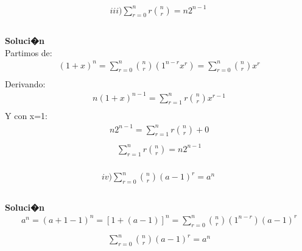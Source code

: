 \documentclass{article}
\begin{document}
\begin{enumerate}
    
     \begin{gather*}
         iii) \sum_{r=0}^{n} r \binom{n}{r} = n2^{n-1}\\ 
    \end{gather*}
    \\\textbf{Soluci�n}\\Partimos de:
    \begin{gather*}
        \   {(1+x)}^n = \sum_{r=0}^{n} \binom{n}{r} (1^{n-r} x^r) =  \sum_{r=0}^{n} \binom{n}{r} x^r \\\
    \end{gather*} Derivando: 
     \begin{gather*}
        \   n{(1+x)}^{n-1} = \sum_{r=1}^{n} r \binom{n}{r} {x^{r-1}} \\\
     \end{gather*} Y con x=1: 
     \begin{gather*}
        \   n2^{n-1} = \sum_{r=1}^{n} r \binom{n}{r} + 0 \\\
    \end{gather*}
    \begin{gather*}
        \   \sum_{r=1}^{n} r \binom{n}{r} =  n2^{n-1} \\\
    \end{gather*}
    
    
    \begin{gather*}
         iv) \sum_{r=0}^{n} \binom{n}{r} {(a-1)}^r = a^n\\ 
    \end{gather*}
    \\\textbf{Soluci�n}\\
    \begin{gather*}
        \  a^n ={(a+1-1)}^n = {[1+(a-1)]}^n = \sum_{r=0}^{n} \binom{n}{r} (1^{n-r}) {(a-1)}^r\\\
    \end{gather*}
    \begin{gather*}
        \  \sum_{r=0}^{n} \binom{n}{r} {(a-1)}^r = a^n\\\
    \end{gather*}
    

\end{enumerate}
\end{document}
